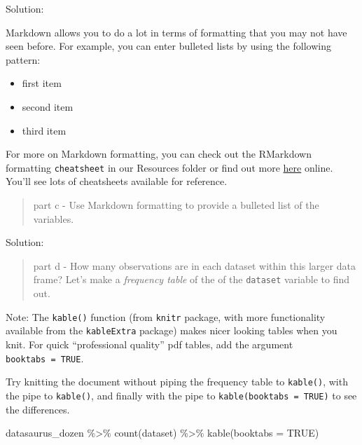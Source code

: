\documentclass[
  letterpaper,
  DIV=11,
  numbers=noendperiod]{scrartcl}
\newenvironment{Shaded}{\begin{snugshade}}{\end{snugshade}}
\newcommand{\AttributeTok}[1]{\textcolor[rgb]{0.40,0.45,0.13}{#1}}
\newcommand{\ConstantTok}[1]{\textcolor[rgb]{0.56,0.35,0.01}{#1}}
\newcommand{\FunctionTok}[1]{\textcolor[rgb]{0.28,0.35,0.67}{#1}}
\newcommand{\NormalTok}[1]{\textcolor[rgb]{0.00,0.23,0.31}{#1}}
\newcommand{\SpecialCharTok}[1]{\textcolor[rgb]{0.37,0.37,0.37}{#1}}
\providecommand{\tightlist}{%
  \setlength{\itemsep}{0pt}\setlength{\parskip}{0pt}}\usepackage{longtable,booktabs,array}
\begin{document}
Solution:

Markdown allows you to do a lot in terms of formatting that you may not
have seen before. For example, you can enter bulleted lists by using the
following pattern:

\begin{itemize}
\tightlist
\item
  first item
\item
  second item
\item
  third item
\end{itemize}

For more on Markdown formatting, you can check out the RMarkdown
formatting \texttt{cheatsheet} in our Resources folder or find out more
\href{https://www.rstudio.com/resources/cheatsheets/}{here} online.
You'll see lots of cheatsheets available for reference.

\begin{quote}
part c - Use Markdown formatting to provide a bulleted list of the
variables.
\end{quote}

Solution:

\begin{quote}
part d - How many observations are in each dataset within this larger
data frame? Let's make a \emph{frequency table} of the of the
\texttt{dataset} variable to find out.
\end{quote}

Note: The \texttt{kable()} function (from \texttt{knitr} package, with
more functionality available from the \texttt{kableExtra} package) makes
nicer looking tables when you knit. For quick ``professional quality''
pdf tables, add the argument \texttt{booktabs\ =\ TRUE}.

Try knitting the document without piping the frequency table to
\texttt{kable()}, with the pipe to \texttt{kable()}, and finally with
the pipe to \texttt{kable(booktabs\ =\ TRUE)} to see the differences.

\begin{Shaded}
\begin{Highlighting}[]
\NormalTok{datasaurus\_dozen }\SpecialCharTok{\%\textgreater{}\%} 
  \FunctionTok{count}\NormalTok{(dataset) }\SpecialCharTok{\%\textgreater{}\%} 
  \FunctionTok{kable}\NormalTok{(}\AttributeTok{booktabs =} \ConstantTok{TRUE}\NormalTok{) }
\end{Highlighting}
\end{Shaded}
\end{document}
